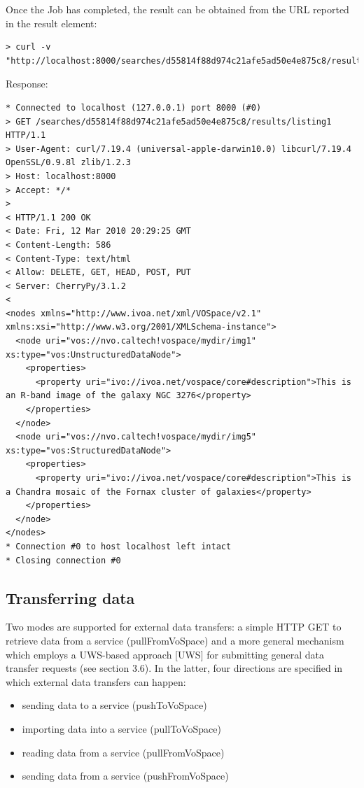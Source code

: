 \documentclass[11pt,a4paper]{ivoa}
\begin{document}
Once the Job has completed, the result can be obtained from the URL reported in the result element:
\begin{lstlisting}
> curl -v "http://localhost:8000/searches/d55814f88d974c21afe5ad50e4e875c8/results/listing1"
\end{lstlisting}
Response:
\begin{lstlisting}
* Connected to localhost (127.0.0.1) port 8000 (#0)
> GET /searches/d55814f88d974c21afe5ad50e4e875c8/results/listing1 HTTP/1.1
> User-Agent: curl/7.19.4 (universal-apple-darwin10.0) libcurl/7.19.4 OpenSSL/0.9.8l zlib/1.2.3
> Host: localhost:8000
> Accept: */*
> 
< HTTP/1.1 200 OK
< Date: Fri, 12 Mar 2010 20:29:25 GMT
< Content-Length: 586
< Content-Type: text/html
< Allow: DELETE, GET, HEAD, POST, PUT
< Server: CherryPy/3.1.2
< 
<nodes xmlns="http://www.ivoa.net/xml/VOSpace/v2.1"
xmlns:xsi="http://www.w3.org/2001/XMLSchema-instance">
  <node uri="vos://nvo.caltech!vospace/mydir/img1" xs:type="vos:UnstructuredDataNode">
    <properties>
      <property uri="ivo://ivoa.net/vospace/core#description">This is an R-band image of the galaxy NGC 3276</property>
    </properties>
  </node>
  <node uri="vos://nvo.caltech!vospace/mydir/img5" xs:type="vos:StructuredDataNode">
    <properties>
      <property uri="ivo://ivoa.net/vospace/core#description">This is a Chandra mosaic of the Fornax cluster of galaxies</property>
    </properties>
  </node>
</nodes>
* Connection #0 to host localhost left intact
* Closing connection #0
\end{lstlisting}

\subsection{Transferring data}
\label{subsec:transferringdata}
Two modes are supported for external data transfers: a simple HTTP GET to retrieve data from a service (pullFromVoSpace) and a more general mechanism which employs a UWS-based approach [UWS] for submitting general data transfer requests (see section 3.6). In the latter, four directions are specified in which external data transfers can happen:
\begin{itemize}
    \item sending data to a service (pushToVoSpace)
    \item importing data into a service (pullToVoSpace)
    \item reading data from a service (pullFromVoSpace)
    \item sending data from a service (pushFromVoSpace)
\end{itemize}
\end{document}
